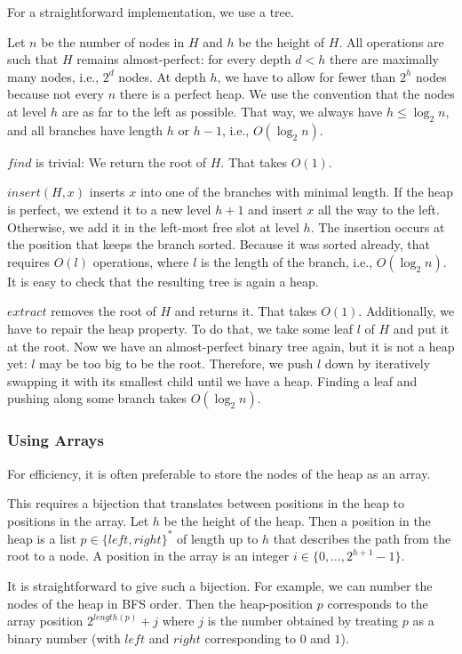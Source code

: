 For a straightforward implementation, we use a tree.

Let $n$ be the number of nodes in $H$ and $h$ be the height of $H$.
All operations are such that $H$ remains almost-perfect: for every depth $d<h$ there are maximally many nodes, i.e., $2^d$ nodes.
At depth $h$, we have to allow for fewer than $2^h$ nodes because not every $n$ there is a perfect heap.
We use the convention that the nodes at level $h$ are as far to the left as possible.
That way, we always have $h\leq\log_2 n$, and all branches have length $h$ or $h-1$, i.e., $O(\log_2 n)$.

$find$ is trivial: We return the root of $H$. That takes $O(1)$.

$insert(H,x)$ inserts $x$ into one of the branches with minimal length.
If the heap is perfect, we extend it to a new level $h+1$ and insert $x$ all the way to the left.
Otherwise, we add it in the left-most free slot at level $h$.
The insertion occurs at the position that keeps the branch sorted.
Because it was sorted already, that requires $O(l)$ operations, where $l$ is the length of the branch, i.e., $O(\log_2 n)$.
It is easy to check that the resulting tree is again a heap.

$extract$ removes the root of $H$ and returns it.
That takes $O(1)$.
Additionally, we have to repair the heap property.
To do that, we take some leaf $l$ of $H$ and put it at the root.
Now we have an almost-perfect binary tree again, but it is not a heap yet: $l$ may be too big to be the root.
Therefore, we push $l$ down by iteratively swapping it with its smallest child until we have a heap.
Finding a leaf and pushing along some branch takes $O(\log_2 n)$.

\subsubsection{Using Arrays}

For efficiency, it is often preferable to store the nodes of the heap as an array.

This requires a bijection that translates between positions in the heap to positions in the array.
Let $h$ be the height of the heap.
Then a position in the heap is a list $p\in\{left,right\}^*$ of length up to $h$ that describes the path from the root to a node.
A position in the array is an integer $i\in\{0,\ldots,2^{h+1}-1\}$.

It is straightforward to give such a bijection.
For example, we can number the nodes of the heap in BFS order.
Then the heap-position $p$ corresponds to the array position $2^{length(p)}+j$ where $j$ is the number obtained by treating $p$ as a binary number (with $left$ and $right$ corresponding to $0$ and $1$).


